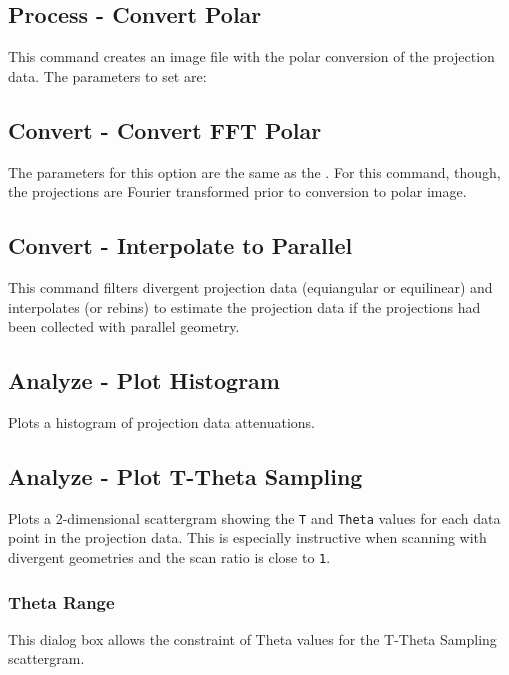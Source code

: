 \subsection{Process - Convert Polar}\label{IDH_DLG_POLAR}
This command creates an image file with the polar conversion of the projection data.
The parameters to set are:

\begin{twocollist}
\end{twocollist}

\subsection{Convert - Convert FFT Polar}
The parameters for this option are the same as the . For this command, though, the
projections are Fourier transformed prior to conversion to polar
image.

\subsection{Convert - Interpolate to Parallel}
This command filters divergent projection data (equiangular or
equilinear) and interpolates (or rebins) to estimate the projection
data if the projections had been collected with parallel geometry.

\subsection{Analyze - Plot Histogram}
Plots a histogram of projection data attenuations.

\subsection{Analyze - Plot T-Theta Sampling}
Plots a 2-dimensional scattergram showing the \texttt{T} and
\texttt{Theta} values for each data point in the projection data.
This is especially instructive when scanning with divergent
geometries and the scan ratio is close to \texttt{1}.

\subsubsection{Theta Range}\label{IDH_DLG_THETA_RANGE}
This dialog box allows the constraint of Theta values for the
T-Theta Sampling scattergram. 

